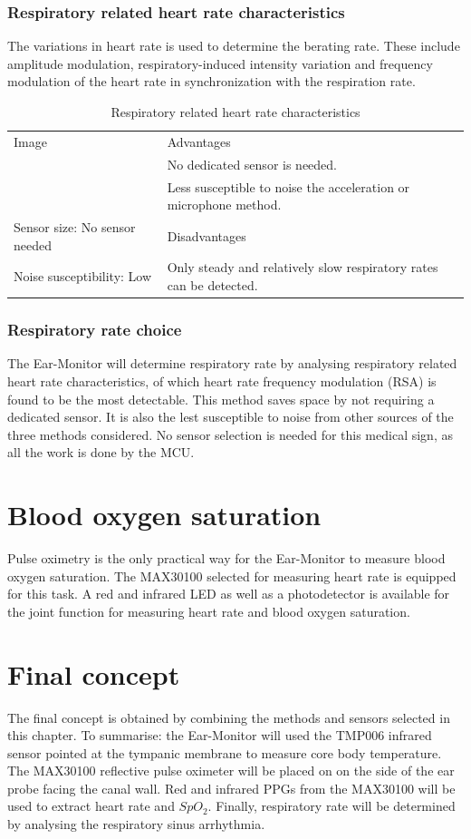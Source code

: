 \subsubsection{Respiratory related heart rate characteristics}
The variations in heart rate is used to determine the berating rate. These include amplitude modulation, respiratory-induced intensity variation and frequency modulation of the heart rate in synchronization with the respiration rate.

\begin{table}[H]
\caption{Respiratory related heart rate characteristics}
\label{tab:EarRRHRC_Eval}
\renewcommand{\arraystretch}{1.3}	%
\centering
\begin{tabular}{|p{5cm}|p{8cm}|} 
 \hline
 Image 		& 	Advantages  \\ 
  			&	\tabitem No dedicated sensor is needed.\\
  			&	\tabitem Less susceptible to noise the acceleration or microphone method.\\
\hline
Sensor size: No sensor needed		&	Disadvantages  \\ 
Noise susceptibility: Low			&	\tabitem Only steady and relatively slow respiratory rates can be detected.\\
 \hline
\end{tabular}
\end{table}

\subsubsection{Respiratory rate choice}
The Ear-Monitor will determine respiratory rate by analysing respiratory related heart rate characteristics, of which heart rate frequency modulation (RSA) is found to be the most detectable. This method saves space by not requiring a dedicated sensor. It is also the lest susceptible to noise from other sources of the three methods considered. No sensor selection is needed for this medical sign, as all the work is done by the MCU.

\section{Blood oxygen saturation}
Pulse oximetry is the only practical way for the Ear-Monitor to measure blood oxygen saturation. The MAX30100 selected for measuring heart rate is equipped for this task. A red and infrared LED as well as a photodetector is available for the joint function for measuring heart rate and blood oxygen saturation.

\section{Final concept}
The final concept is obtained by combining the methods and sensors selected in this chapter. To summarise: the Ear-Monitor will used the TMP006 infrared sensor pointed at the tympanic membrane to measure core body temperature. The MAX30100 reflective pulse oximeter will be placed on on the side of the ear probe facing the canal wall. Red and infrared PPGs from the MAX30100 will be used to extract heart rate and $SpO_2$. Finally, respiratory rate will be determined by analysing the respiratory sinus arrhythmia.
